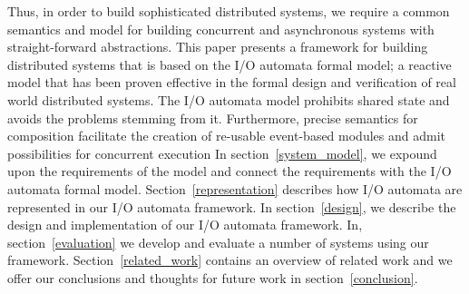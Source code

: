 
Thus, in order to build sophisticated distributed systems, we require a common semantics and model for building concurrent and asynchronous systems with straight-forward abstractions.
This paper presents a framework for building distributed systems that is based on the I/O automata formal model; a reactive model that has been proven effective in the formal design and verification of real world distributed systems.
The I/O automata model prohibits shared state and avoids the problems stemming from it.
Furthermore, precise semantics for composition facilitate the creation of re-usable event-based modules and admit possibilities for concurrent execution
In section~\ref{system_model}, we expound upon the requirements of the model and connect the requirements with the I/O automata formal model.
Section~\ref{representation} describes how I/O automata are represented in our I/O automata framework.
In section~\ref{design}, we describe the design and implementation of our I/O automata framework.
In, section~\ref{evaluation} we develop and evaluate a number of systems using our framework.
Section~\ref{related_work} contains an overview of related work and we offer our conclusions and thoughts for future work in section~\ref{conclusion}.

